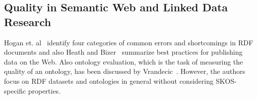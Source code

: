 \subsection{Quality in Semantic Web and Linked Data Research}

Hogan et. al~\cite{Hogan2010} identify four categories of common errors and shortcomings in RDF documents and also Heath and Bizer~\cite{Heath2011} summarize best practices for publishing data on the Web. Also ontology evaluation, which is the task of measuring the quality of an ontology, has been discussed by Vrandecic~\cite{Vrandecic2010}. However, the authors focus on RDF datasets and ontologies in general without considering SKOS-specific properties. 